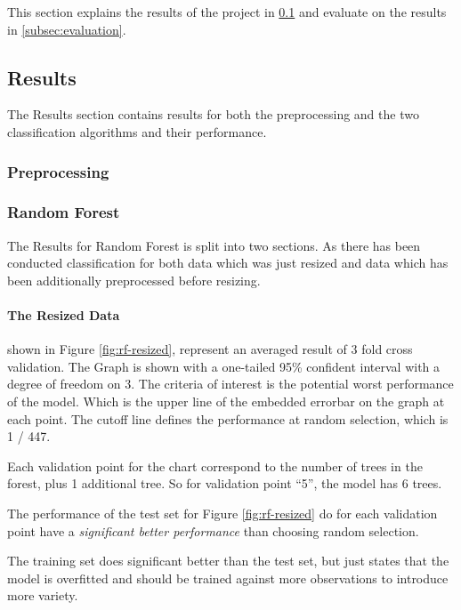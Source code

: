This section explains the results of the project in \ref{subsec:results} and evaluate on the results in \ref{subsec:evaluation}.

\subsection{Results}
\label{subsec:results}
The Results section contains results for both the preprocessing and the two classification algorithms and their performance.

\subsubsection{Preprocessing}








\subsubsection{Random Forest}
The Results for Random Forest is split into two sections. As there has been conducted classification for both data which was just resized and data which has been additionally preprocessed before resizing.

\paragraph{The Resized Data}
\label{par:rf-resized}
shown in Figure \ref{fig:rf-resized}, represent an averaged result of 3 fold cross validation. The Graph is shown with a one-tailed 95\% confident interval with a degree of freedom on 3. The criteria of interest is the potential worst performance of the model. Which is the upper line of the embedded errorbar on the graph at each point. The cutoff line defines the performance at random selection, which is 1 / 447. 

Each validation point for the chart correspond to the number of trees in the forest, plus 1 additional tree. So for validation point ``5'', the model has 6 trees.

The performance of the test set for Figure \ref{fig:rf-resized} do for each validation point have a \emph{significant better performance} than choosing random selection.

The training set does significant better than the test set, but just states that the model is overfitted and should be trained against more observations to introduce more variety.


